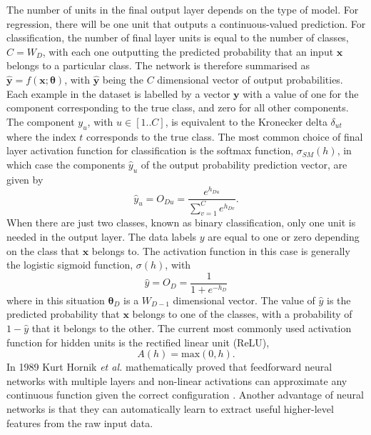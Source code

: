 \documentclass[12pt]{article}
\begin{document}
The number of units in the final output layer depends on the type of model. For regression, there will be one unit that outputs a continuous-valued prediction. For classification, the number of final layer units is equal to the number of classes, $C=W_D$, with each one outputting the predicted probability that an input $\bm{x}$ belongs to a particular class. The network is therefore summarised as $\hat{\bm{y}}=f(\bm{x};\boldsymbol\theta)$, with $\hat{\bm{y}}$ being the $C$ dimensional vector of output probabilities. Each example in the dataset is labelled by a vector $\bm{y}$ with a value of one for the component corresponding to the true class, and zero for all other components. The component $y_u$, with $u\in[1..C]$, is equivalent to the Kronecker delta $\delta_{ut}$ where the index $t$ corresponds to the true class. The most common choice of final layer activation function for classification is the softmax function, $\sigma_{SM}(h)$, in which case the components $\hat{y}_u$ of the output probability prediction vector, are given by
\begin{equation}
\hat{y}_u=O_{Du}=\frac{e^{h_{Du}}}{\sum_{v=1}^{C}e^{h_{Dv}}}.
\end{equation} 
When there are just two classes, known as binary classification, only one unit is needed in the output layer. The data labels $y$ are equal to one or zero depending on the class that $\bm{x}$ belongs to. The activation function in this case is generally the logistic sigmoid function, $\sigma(h)$, with
\begin{equation}
\hat{y}=O_D=\frac{1}{1+e^{-h_D}}
\end{equation}
where in this situation $\boldsymbol\theta_D$ is a $W_{D-1}$ dimensional vector. The value of $\hat{y}$ is the predicted probability that $\bm{x}$ belongs to one of the classes, with a probability of $1-\hat{y}$ that it belongs to the other. The current most commonly used activation function for hidden units is the rectified linear unit (ReLU),
\begin{equation}
A(h)=\mathrm{max}(0,h).
\end{equation}
In 1989 Kurt Hornik \textit{et al.} mathematically proved that feedforward neural networks with multiple layers and non-linear activations can approximate any continuous function given the correct configuration \cite{Hornik89}. Another advantage of neural networks is that they can automatically learn to extract useful higher-level features from the raw input data.
\end{document}
